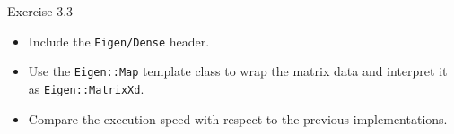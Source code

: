 \documentclass[10pt]{beamer}
\begin{document}
\begin{frame}{Exercise 3.3}
    \begin{itemize}
        \item Include the \texttt{Eigen/Dense} header.
        \item Use the \texttt{Eigen::Map} template class to wrap the matrix data and interpret it as \texttt{Eigen::MatrixXd}.
        \item Compare the execution speed with respect to the previous implementations.
    \end{itemize}
\end{frame}
\end{document}
